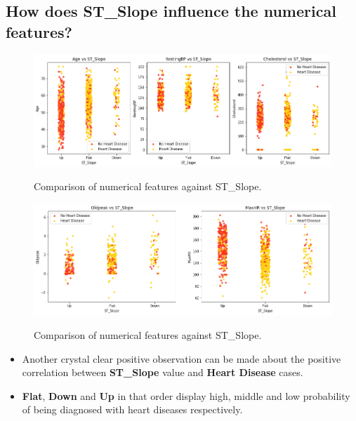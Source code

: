 \subsection{How does ST\_Slope influence the numerical features?}
\begin{figure}[!htpb]
    \centering
    \includegraphics[width=0.7\linewidth]{Figures/Outputs/stslope-num.png}
    \label{Comparison between numerical features against ST_Slope}
    \caption{Comparison of numerical features against ST\_Slope.}
\end{figure}
\begin{figure}[!htpb]
    \centering
    \includegraphics[width=0.7\linewidth]{Figures/Outputs/stslope-num2.png}
    \label{Comparison between numerical features against ST_Slope}
    \caption{Comparison of numerical features against ST\_Slope.}
\end{figure}
\begin{itemize}
    \item Another crystal clear positive observation can be made about the positive correlation between \textbf{ST\_Slope} value and \textbf{Heart Disease} cases. 
    \item \textbf{Flat}, \textbf{Down} and \textbf{Up} in that order display high, middle and low probability of being diagnosed with heart diseases respectively.
\end{itemize}
\newpage
